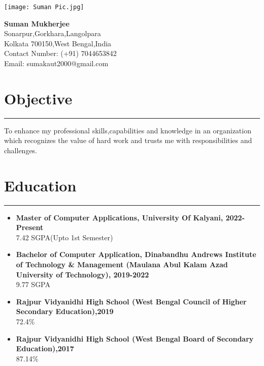 \documentclass[10pt]{report}
\begin{document}
\begin{minipage}{0.6\textwidth}
  \begin{flushleft}
    \texttt{[image: Suman Pic.jpg]} \\
    [1cm]
  \end{flushleft}
\end{minipage}
\hfill
\begin{minipage}{0.4\textwidth}
  \begin{flushright}
    \textbf{\large Suman Mukherjee} \\
     Sonarpur,Gorkhara,Langolpara\\
    Kolkata 700150,West Bengal,India \\
    Contact Number: (+91) 7044653842\\
    Email: sumakaut2000@gmail.com
  \end{flushright}
\end{minipage}

\section{Objective}
\hrule
\vspace{5pt}
 To enhance my professional skills,capabilities and knowledge in an organization which recognizes the value of hard work and trusts me with responsibilities and challenges.

\section{Education}
\hrule
\vspace{5pt}
\begin{itemize}
  \item \textbf{Master of Computer Applications, University Of Kalyani, 2022-Present}\\
  7.42 SGPA(Upto 1st Semester)
  \item \textbf{Bachelor of  Computer Application, Dinabandhu Andrews Institute of Technology \& Management (Maulana Abul Kalam Azad University of Technology), 2019-2022}\\
  9.77 SGPA 
  \item \textbf{Rajpur Vidyanidhi High School (West Bengal Council of Higher Secondary Education),2019}\\
  72.4\%
  \item \textbf{Rajpur Vidyanidhi High School (West Bengal Board of Secondary Education),2017}\\
  87.14\%
\end{itemize}
\end{document}
